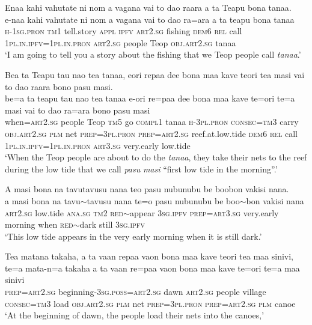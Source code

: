 \ea\label{ex:text25-1}
Enaa kahi vahutate ni nom a vagana vai to dao raara a ta Teapu bona tanaa.\\
\gll e-naa	kahi	vahutate	ni	nom	a	vagana	vai	to	dao	ra=ara	a	ta	teapu	bona	tanaa\\
     \textsc{h}-1\textsc{sg}.\textsc{pron}	\textsc{tm}1	tell.story	\textsc{appl}	\textsc{ipfv}	\textsc{art}2.\textsc{sg}	fishing	\textsc{dem}6	\textsc{rel}	call	1\textsc{pl}.\textsc{in}.\textsc{ipfv}=1\textsc{pl}.\textsc{in}.\textsc{pron}	\textsc{art}2.\textsc{sg}	people	Teop	\textsc{obj}.\textsc{art}2.\textsc{sg}	tanaa\\
\glt `I am going to tell you a story about the fishing that we Teop people call \textit{tanaa}.'
\z

\ea\label{ex:text25-2}
Bea ta Teapu tau nao tea tanaa, eori repaa dee bona maa kave teori tea masi vai to dao raara bono pasu masi.\\
\gll be=a	ta	teapu	tau	nao	tea	tanaa	e-ori	re=paa	dee	bona	maa	kave	te=ori	te=a	masi	vai	to	dao	ra=ara	bono	pasu	masi\\
     when=\textsc{art}2.\textsc{sg}	people	Teop	\textsc{tm}5	go	\textsc{compl}1	tanaa	\textsc{h}-3\textsc{pl}.\textsc{pron}	\textsc{consec}=\textsc{tm}3	carry	\textsc{obj}.\textsc{art}2.\textsc{sg}	\textsc{plm}	net	\textsc{prep}=3\textsc{pl}.\textsc{pron}	\textsc{prep}=\textsc{art}2.\textsc{sg}	reef.at.low.tide	\textsc{dem}6	\textsc{rel}	call	1\textsc{pl}.\textsc{in}.\textsc{ipfv}=1\textsc{pl}.\textsc{in}.\textsc{pron}	\textsc{art}3.\textsc{sg}	very.early	low.tide\\
\glt `When the Teop people are about to do the \textit{tanaa}, they take their nets to the reef during the low tide that we call \textit{pasu} \textit{masi} ``first low tide in the morning''.'
\z

\ea\label{ex:text25-3}
A masi bona na tavutavusu nana teo pasu nubunubu be boobon vakisi nana.\\
\gll a	masi	bona	na	tavu{$\sim$}tavusu	nana	te=o	pasu	nubunubu	be	boo{$\sim$}bon	vakisi	nana\\
     \textsc{art}2.\textsc{sg}	low.tide	\textsc{ana}.\textsc{sg}	\textsc{tm}2	\textsc{red}{$\sim$}appear	3\textsc{sg}.\textsc{ipfv}	\textsc{prep}=\textsc{art}3.\textsc{sg}	very.early	morning	when	\textsc{red}{$\sim$}dark	still	3\textsc{sg}.\textsc{ipfv}\\
\glt `This low tide appears in the very early morning when it is still dark.'
\z

\ea\label{ex:text25-4}
Tea matana takaha, a ta vaan repaa vaon bona maa kave teori tea maa sinivi,\\
\gll te=a	mata-n=a	takaha	a	ta	vaan	re=paa	vaon	bona	maa	kave	te=ori	te=a	maa	sinivi\\
     \textsc{prep}=\textsc{art}2.\textsc{sg}	beginning-3\textsc{sg}.\textsc{poss}=\textsc{art}2.\textsc{sg}	dawn	\textsc{art}2.\textsc{sg}	people	village	\textsc{consec}=\textsc{tm}3	load	\textsc{obj}.\textsc{art}2.\textsc{sg}	\textsc{plm}	net	\textsc{prep}=3\textsc{pl}.\textsc{pron}	\textsc{prep}=\textsc{art}2.\textsc{sg}	\textsc{plm}	canoe\\
\glt `At the beginning of dawn, the people load their nets into the canoes,'
\z


